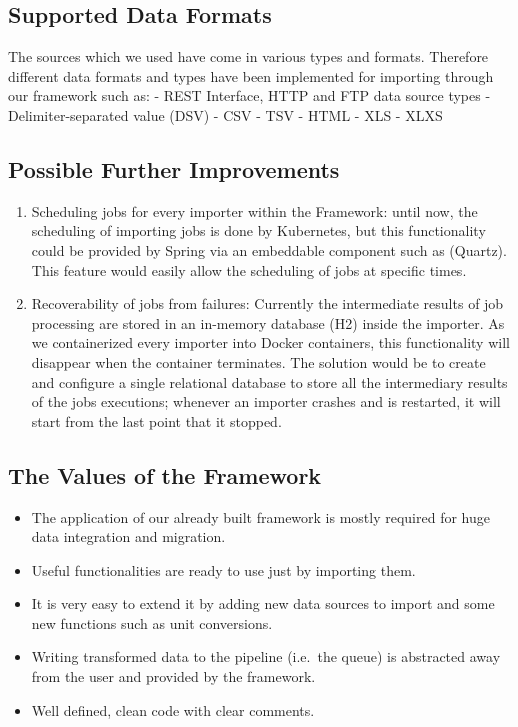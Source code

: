 \subsection{Supported Data Formats}\label{supported-data-formats}

The sources which we used have come in various types and formats.
Therefore different data formats and types have been implemented for
importing through our framework such as: - REST Interface, HTTP and FTP
data source types - Delimiter-separated value (DSV) - CSV - TSV - HTML -
XLS - XLXS

\subsection{Possible Further
Improvements}\label{possible-further-improvements}

\begin{enumerate}
\def\labelenumi{\arabic{enumi}.}
\tightlist
\item
  Scheduling jobs for every importer within the Framework: until now,
  the scheduling of importing jobs is done by Kubernetes, but this
  functionality could be provided by Spring via an embeddable component
  such as (Quartz). This feature would easily allow the scheduling of
  jobs at specific times.
\item
  Recoverability of jobs from failures: Currently the intermediate
  results of job processing are stored in an in-memory database (H2)
  inside the importer. As we containerized every importer into Docker
  containers, this functionality will disappear when the container
  terminates. The solution would be to create and configure a single
  relational database to store all the intermediary results of the jobs
  executions; whenever an importer crashes and is restarted, it will
  start from the last point that it stopped.
\end{enumerate}

\subsection{The Values of the
Framework}\label{the-values-of-the-framework}

\begin{itemize}
\tightlist
\item
  The application of our already built framework is mostly required for
  huge data integration and migration.
\item
  Useful functionalities are ready to use just by importing them.
\item
  It is very easy to extend it by adding new data sources to import and
  some new functions such as unit conversions.
\item
  Writing transformed data to the pipeline (i.e.~the queue) is
  abstracted away from the user and provided by the framework.
\item
  Well defined, clean code with clear comments.
\end{itemize}

